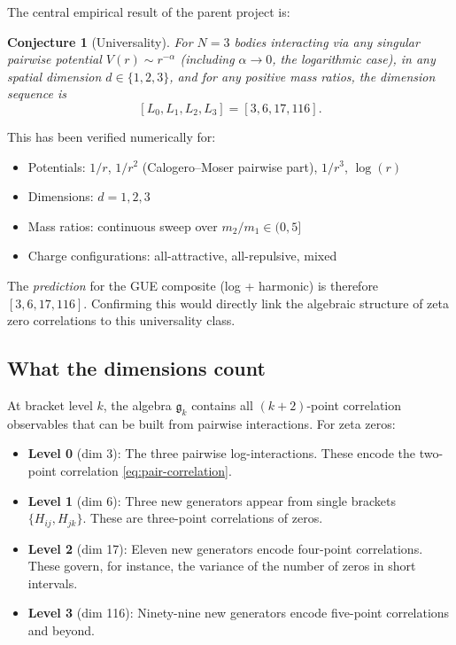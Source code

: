 \documentclass[11pt,a4paper]{article}
\newtheorem{conjecture}{Conjecture}
\begin{document}
The central empirical result of the parent project is:

\begin{conjecture}[Universality]
  For $N = 3$ bodies interacting via any singular pairwise potential
  $V(r) \sim r^{-\alpha}$ (including $\alpha \to 0$, the logarithmic
  case), in any spatial dimension $d \in \{1, 2, 3\}$, and for any
  positive mass ratios, the dimension sequence is
  \[
    [L_0, L_1, L_2, L_3] = [3, 6, 17, 116].
  \]
\end{conjecture}

This has been verified numerically for:
\begin{itemize}
  \item Potentials: $1/r$, $1/r^2$ (Calogero--Moser pairwise part),
    $1/r^3$, $\log(r)$
  \item Dimensions: $d = 1, 2, 3$
  \item Mass ratios: continuous sweep over $m_2/m_1 \in (0, 5]$
  \item Charge configurations: all-attractive, all-repulsive, mixed
\end{itemize}

The \emph{prediction} for the GUE composite (log + harmonic) is therefore
$[3, 6, 17, 116]$. Confirming this would directly link the algebraic
structure of zeta zero correlations to this universality class.

\subsection{What the dimensions count}

At bracket level $k$, the algebra $\mathfrak{g}_k$ contains all
$(k+2)$-point correlation observables that can be built from pairwise
interactions. For zeta zeros:

\begin{itemize}
  \item \textbf{Level 0} (dim 3): The three pairwise log-interactions.
    These encode the two-point correlation \eqref{eq:pair-correlation}.

  \item \textbf{Level 1} (dim 6): Three new generators appear from
    single brackets $\{H_{ij}, H_{jk}\}$. These are three-point
    correlations of zeros.

  \item \textbf{Level 2} (dim 17): Eleven new generators encode
    four-point correlations. These govern, for instance, the variance of
    the number of zeros in short intervals.

  \item \textbf{Level 3} (dim 116): Ninety-nine new generators encode
    five-point correlations and beyond.
\end{itemize}
\end{document}
